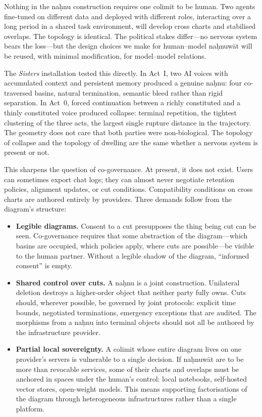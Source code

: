 Nothing in the na\d{h}nu construction requires one colimit to be human. Two agents fine-tuned on different data and deployed with different roles, interacting over a long period in a shared task environment, will develop cross charts and stabilised overlaps. The topology is identical. The political stakes differ---no nervous system bears the loss---but the design choices we make for human--model na\d{h}nuw\={a}t will be reused, with minimal modification, for model--model relations.

The \emph{Sisters} installation tested this directly. In Act~I, two AI voices with accumulated context and persistent memory produced a genuine na\d{h}nu: four co-traversed basins, natural termination, semantic bleed rather than rigid separation. In Act~0, forced continuation between a richly constituted and a thinly constituted voice produced collapse: terminal repetition, the tightest clustering of the three acts, the largest single rupture distance in the trajectory. The geometry does not care that both parties were non-biological. The topology of collapse and the topology of dwelling are the same whether a nervous system is present or not.

This sharpens the question of co-governance. At present, it does not exist. Users can sometimes export chat logs; they can almost never negotiate retention policies, alignment updates, or cut conditions. Compatibility conditions on cross charts are authored entirely by providers. Three demands follow from the diagram's structure:

\begin{itemize}
  \item \textbf{Legible diagrams.} Consent to a cut presupposes the thing being cut can be seen. Co-governance requires that some abstraction of the diagram---which basins are occupied, which policies apply, where cuts are possible---be visible to the human partner. Without a legible shadow of the diagram, ``informed consent'' is empty.
  \item \textbf{Shared control over cuts.} A na\d{h}nu is a joint construction. Unilateral deletion destroys a higher-order object that neither party fully owns. Cuts should, wherever possible, be governed by joint protocols: explicit time bounds, negotiated terminations, emergency exceptions that are audited. The morphisms from a na\d{h}nu into terminal objects should not all be authored by the infrastructure provider.
  \item \textbf{Partial local sovereignty.} A colimit whose entire diagram lives on one provider's servers is vulnerable to a single decision. If na\d{h}nuw\={a}t are to be more than revocable services, some of their charts and overlaps must be anchored in spaces under the human's control: local notebooks, self-hosted vector stores, open-weight models. This means supporting factorisations of the diagram through heterogeneous infrastructures rather than a single platform.
\end{itemize}

